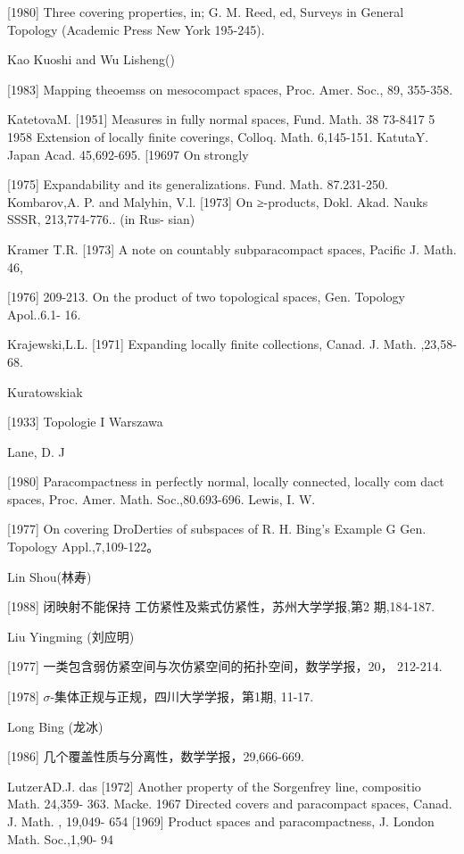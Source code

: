 \documentclass[main.tex]{subfiles}
\begin{document}
[1980]
Three covering properties, in; G. M. Reed, ed, Surveys in General
Topology (Academic Press New York 195-245).

Kao Kuoshi and Wu Lisheng()

[1983]
Mapping theoemss on mesocompact spaces, Proc. Amer. Soc., 89,
355-358.

KatetovaM.
[1951]
Measures in fully normal spaces, Fund. Math. 38 73-8417
5 1958 Extension
of locally finite coverings, Colloq. Math. 6,145-151.
KatutaY.
Japan Acad. 45,692-695.
[19697
On strongly

[1975]
Expandability and its generalizations. Fund. Math. 87.231-250.
Kombarov,A. P. and Malyhin, V.l.
[1973] On ≥-products, Dokl. Akad. Nauks SSSR, 213,774-776.. (in Rus-
sian)

Kramer T.R.
[1973]
A note on countably subparacompact spaces, Pacific J. Math. 46,

[1976]
209-213.
On the product of two topological spaces, Gen. Topology Apol..6.1-
16.

Krajewski,L.L.
[1971] Expanding locally finite collections, Canad. J. Math.
,23,58-68.

Kuratowskiak

[1933]
Topologie I Warszawa

Lane, D. J

[1980] Paracompactness in perfectly normal, locally connected, locally com
dact spaces, Proc. Amer. Math. Soc.,80.693-696.
Lewis, I. W.

[1977]
On covering DroDerties of subspaces of R. H. Bing's Example G
Gen. Topology Appl.,7,109-122。

\noindent Lin Shou(林寿)

[1988] 闭映射不能保持 工仿紧性及紫式仿紧性，苏州大学学报,第2
期,184-187.

\noindent Liu Yingming (刘应明)

[1977] 一类包含弱仿紧空间与次仿紧空间的拓扑空间，数学学报，20，
212-214.

[1978] $\sigma$-集体正规与正规，四川大学学报，第1期, 11-17.


\noindent Long Bing (龙冰)

[1986] 几个覆盖性质与分离性，数学学报，29,666-669.

\noindent LutzerAD.J.
das [1972]
Another property of the Sorgenfrey line, compositio Math. 24,359-
363.
Macke.
1967 Directed covers and paracompact spaces, Canad. J. Math. , 19,049-
654
[1969] Product spaces and paracompactness, J. London Math. Soc.,1,90-
94
\end{document}
